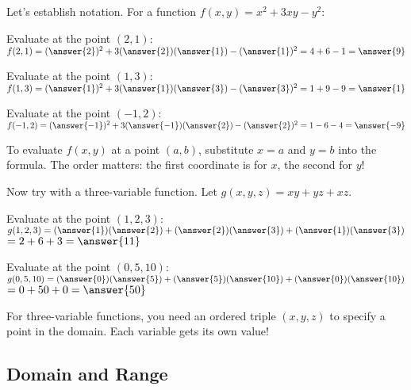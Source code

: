 \documentclass{ximera}
\begin{document}
\begin{problem}
Let's establish notation. For a function $f(x, y) = x^2 + 3xy - y^2$:

Evaluate at the point $(2, 1)$:
$f(2, 1) = (\answer{2})^2 + 3(\answer{2})(\answer{1}) - (\answer{1})^2 = 4 + 6 - 1 = \answer{9}$

Evaluate at the point $(1, 3)$:
$f(1, 3) = (\answer{1})^2 + 3(\answer{1})(\answer{3}) - (\answer{3})^2 = 1 + 9 - 9 = \answer{1}$

Evaluate at the point $(-1, 2)$:
$f(-1, 2) = (\answer{-1})^2 + 3(\answer{-1})(\answer{2}) - (\answer{2})^2 = 1 - 6 - 4 = \answer{-9}$

\begin{feedback}
To evaluate $f(x,y)$ at a point $(a,b)$, substitute $x=a$ and $y=b$ into the formula. The order matters: the first coordinate is for $x$, the second for $y$!
\end{feedback}
\end{problem}

\begin{problem}
Now try with a three-variable function. Let $g(x, y, z) = xy + yz + xz$.

Evaluate at the point $(1, 2, 3)$:
$g(1, 2, 3) = (\answer{1})(\answer{2}) + (\answer{2})(\answer{3}) + (\answer{1})(\answer{3})$
$= 2 + 6 + 3 = \answer{11}$

Evaluate at the point $(0, 5, 10)$:
$g(0, 5, 10) = (\answer{0})(\answer{5}) + (\answer{5})(\answer{10}) + (\answer{0})(\answer{10})$
$= 0 + 50 + 0 = \answer{50}$

\begin{feedback}
For three-variable functions, you need an ordered triple $(x, y, z)$ to specify a point in the domain. Each variable gets its own value!
\end{feedback}
\end{problem}

\subsection*{Domain and Range}
\end{document}
